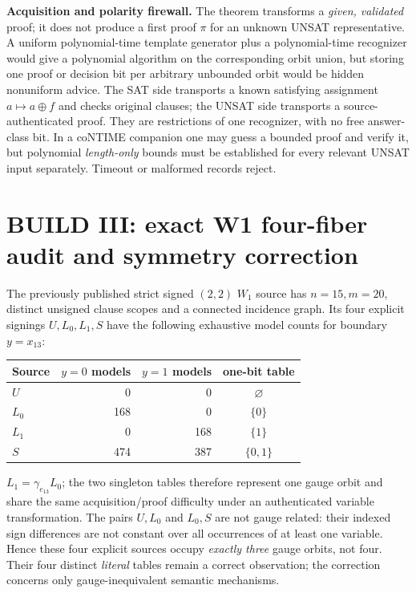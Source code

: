 \documentclass[11pt]{article}
\begin{document}
\noindent\textbf{Acquisition and polarity firewall.} The theorem transforms a \emph{given, validated} proof; it does not produce a first proof $\pi$ for an unknown UNSAT representative. A uniform polynomial-time template generator plus a polynomial-time recognizer would give a polynomial algorithm on the corresponding orbit union, but storing one proof or decision bit per arbitrary unbounded orbit would be hidden nonuniform advice. The SAT side transports a known satisfying assignment $a\mapsto a\oplus f$ and checks original clauses; the UNSAT side transports a source-authenticated proof. They are restrictions of one recognizer, with no free answer-class bit. In a coNTIME companion one may guess a bounded proof and verify it, but polynomial \emph{length-only} bounds must be established for every relevant UNSAT input separately. Timeout or malformed records reject.

\section{BUILD III: exact W1 four-fiber audit and symmetry correction}
The previously published strict signed $(2,2)$ $W_1$ source has $n=15,m=20$, distinct unsigned clause scopes and a connected incidence graph. Its four explicit signings $U,L_0,L_1,S$ have the following exhaustive model counts for boundary $y=x_{13}$:
\begin{center}\begin{tabular}{lrrc}\toprule
Source&$y=0$ models&$y=1$ models&one-bit table\\\midrule
$U$&0&0&$\varnothing$\\
$L_0$&168&0&$\{0\}$\\
$L_1$&0&168&$\{1\}$\\
$S$&474&387&$\{0,1\}$\\\bottomrule
\end{tabular}\end{center}
$L_1=\gamma_{e_{13}}L_0$; the two singleton tables therefore represent one gauge orbit and share the same acquisition/proof difficulty under an authenticated variable transformation. The pairs $U,L_0$ and $L_0,S$ are not gauge related: their indexed sign differences are not constant over all occurrences of at least one variable. Hence these four explicit sources occupy \emph{exactly three} gauge orbits, not four. Their four distinct \emph{literal} tables remain a correct observation; the correction concerns only gauge-inequivalent semantic mechanisms.
\end{document}
